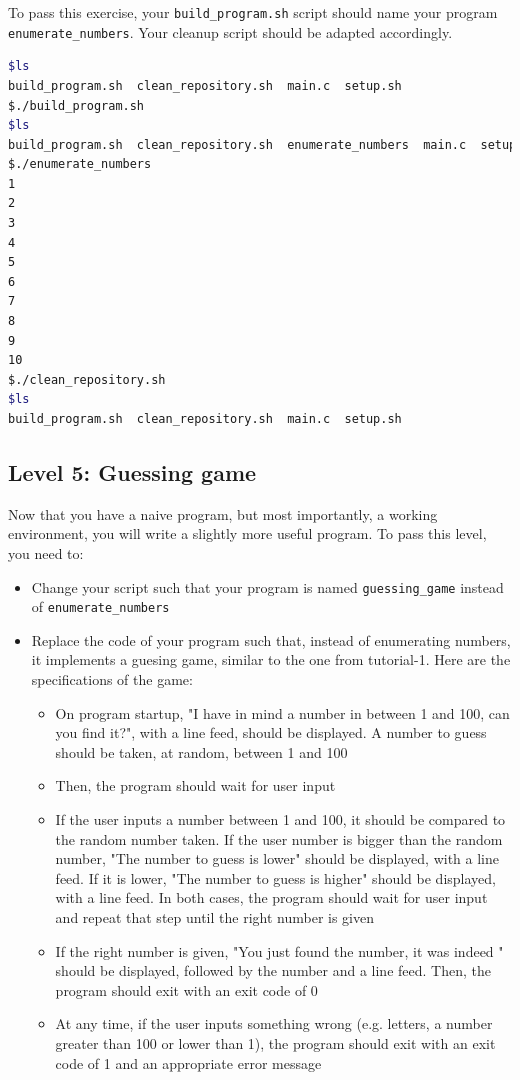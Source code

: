\documentclass[12pt]{article}
\begin{document}
To pass this exercise, your \texttt{build\_program.sh} script should name your program \texttt{enumerate\_numbers}. Your cleanup script should be adapted accordingly.

\begin{lstlisting}[language=bash]
$ls
build_program.sh  clean_repository.sh  main.c  setup.sh
$./build_program.sh
$ls
build_program.sh  clean_repository.sh  enumerate_numbers  main.c  setup.sh
$./enumerate_numbers
1
2
3
4
5
6
7
8
9
10
$./clean_repository.sh
$ls
build_program.sh  clean_repository.sh  main.c  setup.sh
\end{lstlisting}

\subsection{Level 5: Guessing game}

Now that you have a naive program, but most importantly, a working environment, you will write a slightly more useful program.
To pass this level, you need to:
\begin{itemize}
	\item Change your script such that your program is named \texttt{guessing\_game} instead of \texttt{enumerate\_numbers}
	\item Replace the code of your program such that, instead of enumerating numbers, it implements a guesing game, similar to the one from tutorial-1. Here are the specifications of the game:
	\begin{itemize}
			\item On program startup, "I have in mind a number in between 1 and 100, can you find it?", with a line feed, should be displayed. A number to guess should be taken, at random, between 1 and 100
			\item Then, the program should wait for user input
			\item If the user inputs a number between 1 and 100, it should be compared to the random number taken. If the user number is bigger than the random number, "The number to guess is lower" should be displayed, with a line feed. If it is lower, "The number to guess is higher" should be displayed, with a line feed. In both cases, the program should wait for user input and repeat that step until the right number is given
			\item If the right number is given, "You just found the number, it was indeed " should be displayed, followed by the number and a line feed. Then, the program should exit with an exit code of 0
			\item At any time, if the user inputs something wrong (e.g. letters, a number greater than 100 or lower than 1), the program should exit with an exit code of 1 and an appropriate error message
		\end{itemize}
\end{itemize}
\end{document}
